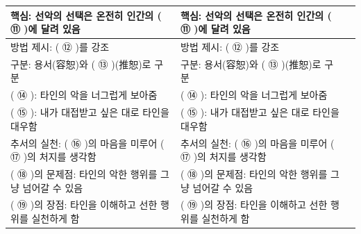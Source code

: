 \documentclass[fs9,seriesRus]{korfarm-base}
\begin{document}
\begin{tcolorbox}
\begin{tabularx}{\linewidth}{|>{\centering\arraybackslash}p{1.6cm}|>{\raggedright\arraybackslash}p{3.4cm}|>{\raggedright\arraybackslash}X|}
핵심: 선악의 선택은 온전히 인간의 ( ⑪ )에 달려 있음 & 핵심: 선악의 선택은 온전히 인간의 ( ⑪ )에 달려 있음 &  \\\hline
방법 제시: ( ⑫ )를 강조 & 방법 제시: ( ⑫ )를 강조 &  \\\hline
구분: 용서(容恕)와 ( ⑬ )(推恕)로 구분 & 구분: 용서(容恕)와 ( ⑬ )(推恕)로 구분 &  \\\hline
( ⑭ ): 타인의 악을 너그럽게 보아줌 & ( ⑭ ): 타인의 악을 너그럽게 보아줌 &  \\\hline
( ⑮ ): 내가 대접받고 싶은 대로 타인을 대우함 & ( ⑮ ): 내가 대접받고 싶은 대로 타인을 대우함 &  \\\hline
추서의 실천: ( ⑯ )의 마음을 미루어 ( ⑰ )의 처지를 생각함 & 추서의 실천: ( ⑯ )의 마음을 미루어 ( ⑰ )의 처지를 생각함 &  \\\hline
( ⑱ )의 문제점: 타인의 악한 행위를 그냥 넘어갈 수 있음 & ( ⑱ )의 문제점: 타인의 악한 행위를 그냥 넘어갈 수 있음 &  \\\hline
( ⑲ )의 장점: 타인을 이해하고 선한 행위를 실천하게 함 & ( ⑲ )의 장점: 타인을 이해하고 선한 행위를 실천하게 함 &  \\\hline
\end{tabularx}
\end{tcolorbox}\par\medskip
{}
\end{document}
